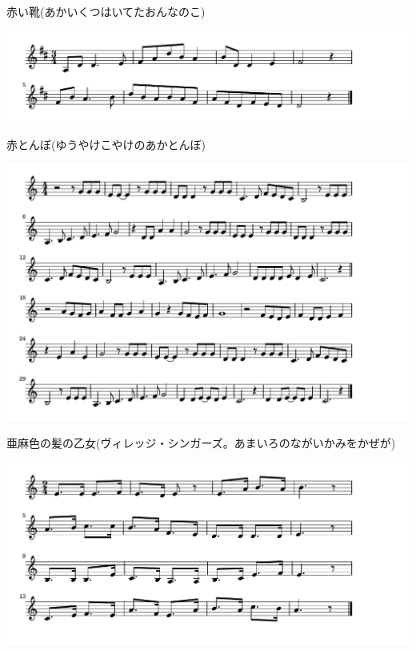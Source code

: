 \documentclass[a4paper]{ltjsarticle}
\begin{document}
\vspace{-10mm} \hspace{10mm}
赤い靴(あかいくつはいてたおんなのこ)

\includegraphics[clip]{akatonbo_crop.pdf}

\vspace{-10mm} \hspace{10mm}
赤とんぼ(ゆうやけこやけのあかとんぼ)

\includegraphics[clip]{amaironokami_crop.pdf}

\vspace{-10mm} \hspace{10mm}
亜麻色の髪の乙女(ヴィレッジ・シンガーズ。あまいろのながいかみをかぜが)

\includegraphics[clip]{anokowatare_crop.pdf}
\end{document}
